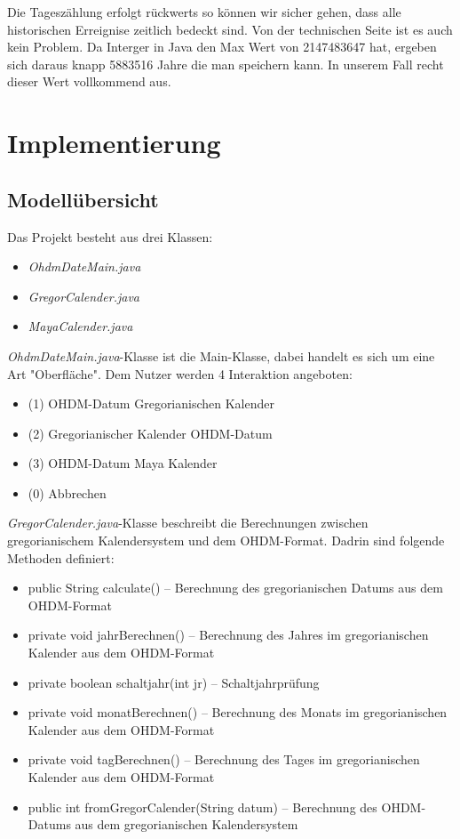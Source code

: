 \documentclass[]{article}
\begin{document}
Die Tageszählung erfolgt rückwerts so können wir sicher gehen, dass alle historischen Erreignise zeitlich bedeckt sind. Von der technischen Seite ist es auch kein Problem. Da Interger in Java den Max Wert von 2147483647 hat, ergeben sich daraus knapp 5883516 Jahre die man speichern kann. In unserem Fall recht dieser Wert vollkommend aus.


\section{Implementierung}
\subsection{Modellübersicht}
Das Projekt besteht aus drei Klassen:
\begin{itemize}
	\item \textit{OhdmDateMain.java}
	\item \textit{GregorCalender.java}
	\item \textit{MayaCalender.java}
	\newline
\end{itemize}


\textit{OhdmDateMain.java}-Klasse ist die Main-Klasse, dabei handelt es sich um eine Art "Oberfläche". Dem Nutzer werden 4 Interaktion angeboten:
\begin{itemize}
	\item (1) OHDM-Datum \textrightarrow Gregorianischen Kalender
	\item (2) Gregorianischer Kalender \textrightarrow OHDM-Datum
	\item (3) OHDM-Datum Maya \textrightarrow Kalender
	\item (0) Abbrechen
	\newline
\end{itemize}

\textit{GregorCalender.java}-Klasse beschreibt die Berechnungen zwischen gregorianischem Kalendersystem und dem OHDM-Format. Dadrin sind folgende Methoden definiert:
\begin{itemize}
	\item public String calculate() –  Berechnung des gregorianischen Datums aus dem OHDM-Format
	\item private void jahrBerechnen() –  Berechnung des Jahres im gregorianischen Kalender aus dem OHDM-Format
	\item private boolean schaltjahr(int jr) – Schaltjahrprüfung
	\item private void monatBerechnen() –  Berechnung des Monats im gregorianischen Kalender aus dem OHDM-Format
	\item private void tagBerechnen() –  Berechnung des Tages im gregorianischen Kalender aus dem OHDM-Format
	\item public int fromGregorCalender(String datum) – Berechnung des OHDM-Datums aus dem gregorianischen Kalendersystem
	\newline
\end{itemize}
\end{document}
